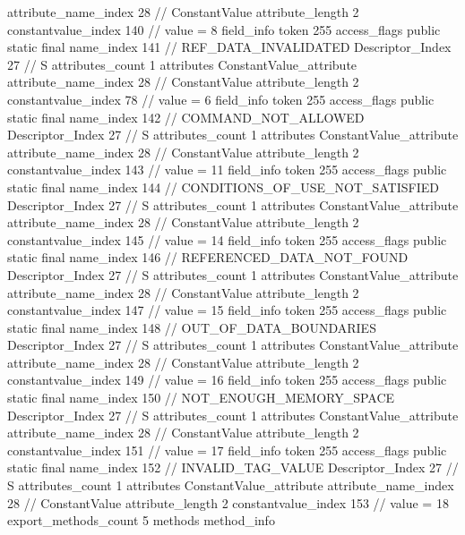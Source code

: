 {{{{{{{					attribute_name_index	28		// ConstantValue
					attribute_length	2
					constantvalue_index	140		// value = 8
				}
				}
			}
			field_info {
				token	255
				access_flags	public static final
				name_index	141		// REF_DATA_INVALIDATED
				Descriptor_Index	27		// S
				attributes_count	1
				attributes {
				ConstantValue_attribute {
					attribute_name_index	28		// ConstantValue
					attribute_length	2
					constantvalue_index	78		// value = 6
				}
				}
			}
			field_info {
				token	255
				access_flags	public static final
				name_index	142		// COMMAND_NOT_ALLOWED
				Descriptor_Index	27		// S
				attributes_count	1
				attributes {
				ConstantValue_attribute {
					attribute_name_index	28		// ConstantValue
					attribute_length	2
					constantvalue_index	143		// value = 11
				}
				}
			}
			field_info {
				token	255
				access_flags	public static final
				name_index	144		// CONDITIONS_OF_USE_NOT_SATISFIED
				Descriptor_Index	27		// S
				attributes_count	1
				attributes {
				ConstantValue_attribute {
					attribute_name_index	28		// ConstantValue
					attribute_length	2
					constantvalue_index	145		// value = 14
				}
				}
			}
			field_info {
				token	255
				access_flags	public static final
				name_index	146		// REFERENCED_DATA_NOT_FOUND
				Descriptor_Index	27		// S
				attributes_count	1
				attributes {
				ConstantValue_attribute {
					attribute_name_index	28		// ConstantValue
					attribute_length	2
					constantvalue_index	147		// value = 15
				}
				}
			}
			field_info {
				token	255
				access_flags	public static final
				name_index	148		// OUT_OF_DATA_BOUNDARIES
				Descriptor_Index	27		// S
				attributes_count	1
				attributes {
				ConstantValue_attribute {
					attribute_name_index	28		// ConstantValue
					attribute_length	2
					constantvalue_index	149		// value = 16
				}
				}
			}
			field_info {
				token	255
				access_flags	public static final
				name_index	150		// NOT_ENOUGH_MEMORY_SPACE
				Descriptor_Index	27		// S
				attributes_count	1
				attributes {
				ConstantValue_attribute {
					attribute_name_index	28		// ConstantValue
					attribute_length	2
					constantvalue_index	151		// value = 17
				}
				}
			}
			field_info {
				token	255
				access_flags	public static final
				name_index	152		// INVALID_TAG_VALUE
				Descriptor_Index	27		// S
				attributes_count	1
				attributes {
				ConstantValue_attribute {
					attribute_name_index	28		// ConstantValue
					attribute_length	2
					constantvalue_index	153		// value = 18
				}
				}
			}
			}
			export_methods_count	5
			methods {
				method_info {
}}}}}
